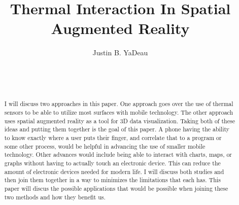 \documentclass{sig-alternate}
\begin{document}

\title{Thermal Interaction In Spatial Augmented Reality}


\author{
\alignauthor
Justin B. YaDeau\\
	\\
	\\
	\\
}

\maketitle

\begin{abstract}
I will discuss two approaches in this paper. One approach goes over the use of thermal sensors to be able to utilize most surfaces with mobile technology. The other approach uses spatial augmented reality as a tool for 3D data visualization. Taking both of these ideas and putting them together is the goal of this paper. A phone having the ability to know exactly where a user puts their finger, and correlate that to a program or some other process, would be helpful in advancing the use of smaller mobile technology. Other advances would include being able to interact with charts, maps, or graphs without having to actually touch an electronic device. This can reduce the amount of electronic devices needed for modern life. I will discuss both studies and then join them together in a way to minimizes the limitations that each has. This paper will discus the possible applications that would be possible when joining these two methods and how they benefit us.

\end{abstract}

\end{document}
